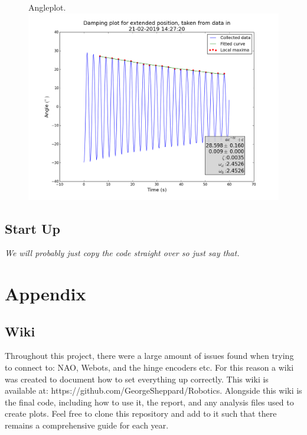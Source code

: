 \documentclass[11pt]{article}
\newcommand*\ruleline[1]{\par\noindent\raisebox{.8ex}{\makebox[\linewidth]{\hrulefill\hspace{1ex}\raisebox{-.8ex}{#1}\hspace{1ex}\hrulefill}}}
\begin{document}
    \begin{figure}[!htb]
        \centering
        \captionbox
             {Angleplot.\label{angleplot}}
             {\includegraphics[width=1.0\textwidth]{ExtendedPositionDamping.png}}
    \end{figure}

\subsection{Start Up}
\textit{We will probably just copy the code straight over so just say that.}


\appendix
\section{Appendix}
\subsection{Wiki} \label{sec:wiki}
\ruleline{George Sheppard}
Throughout this project, there were a large amount of issues found when trying to connect to: NAO, Webots, and the hinge encoders etc. For this reason a wiki was created to document how to set everything up correctly. This wiki is available at: https://github.com/GeorgeSheppard/Robotics. Alongside this wiki is the final code, including how to use it, the report, and any analysis files used to create plots. Feel free to clone this repository and add to it such that there remains a comprehensive guide for each year.
\end{document}
